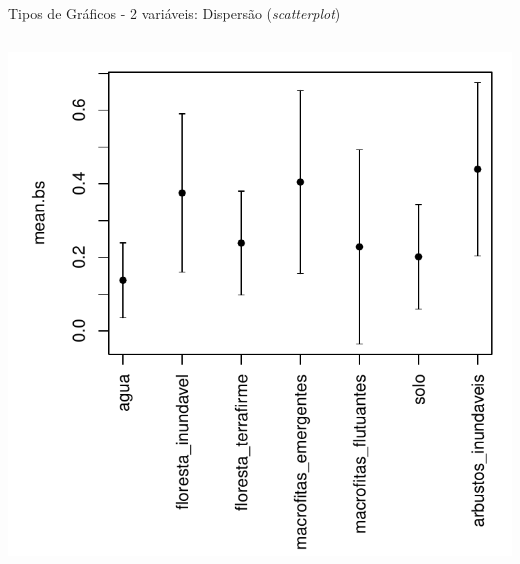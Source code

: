 \documentclass{beamer}\usepackage[]{graphicx}\usepackage[]{color}
\newenvironment{knitrout}{}{} %
\renewenvironment{knitrout}{\setlength{\topsep}{0mm}}{}
\begin{document}
\begin{frame}[fragile]{Tipos de Gráficos - 2 variáveis: Dispersão (\emph{scatterplot})}
\begin{columns}[t]
\begin{knitrout}
\color{fgcolor}
\includegraphics[width=1\linewidth]{figure/unnamed-chunk-63-1} 

\end{knitrout}

\end{columns}

\end{frame}
\end{document}
